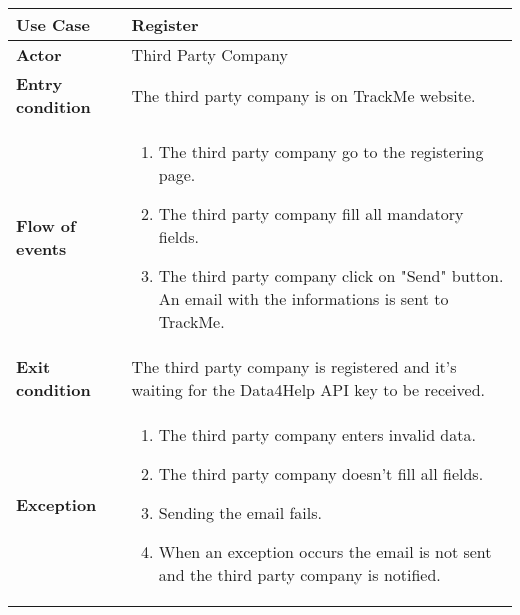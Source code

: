 \documentclass[../main.tex]{subfiles}
\begin{document}
	\begin{center}
		\begin{tabular}{p{3cm}p{8.28cm}}
			\hline
			\textbf{Use Case} & Register\\
			\hline
			\textbf{Actor} & Third Party Company\\
			\hline
			\textbf{Entry condition} & The third party company is on TrackMe website.\\
			\hline
			\textbf{Flow of events} & \begin{enumerate}
				\linespread{0}\item The third party company go to the registering page.
				\linespread{0}\item The third party company fill all mandatory fields.
				\linespread{0}\item The third party company click on "Send" button. An email with the informations is sent to TrackMe.
			\end{enumerate}\\
			\hline
			\textbf{Exit condition} & The third party company is registered and it's waiting for the Data4Help API key to be received.\\
			\hline
			\textbf{Exception} & \begin{enumerate}
				\linespread{0}\item The third party company enters invalid data.
				\linespread{0}\item The third party company doesn't fill all fields.
				\linespread{0}\item Sending the email fails.
				\linespread{0}\item When an exception occurs the email is not sent and the third party company is notified.
			\end{enumerate}\\
			\hline
		\end{tabular}
	\end{center}
	\vspace*{3cm}
\end{document}
